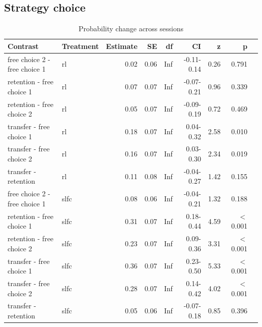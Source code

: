 \documentclass[pdflatex,sn-nature]{sn-jnl}%
\theoremstyle{thmstyleone}%
\theoremstyle{thmstyletwo}%
\theoremstyle{thmstylethree}%
\begin{document}
\begin{appendices}
\subsection{Strategy choice}








\begin{table}[ht]
\caption{Probability change across sessions}\label{strategychoice_theorybest_change}
\begin{tabular}{llrrrrrrr}
  \hline
 Contrast & Treatment & Estimate & SE & df & CI & z & p \\ 
  \hline
  free choice 2 - free choice 1 & rl & 0.02 & 0.06 & Inf & -0.11-0.14 & 0.26 &   0.791 \\ 
  retention - free choice 1 & rl & 0.07 & 0.07 & Inf & -0.07-0.21 & 0.96 &   0.339 \\ 
  retention - free choice 2 & rl & 0.05 & 0.07 & Inf & -0.09-0.19 & 0.72 &    0.469 \\ 
  transfer - free choice 1 & rl & 0.18 & 0.07 & Inf & 0.04-0.32 & 2.58 &    0.010 \\ 
  transfer - free choice 2 & rl & 0.16 & 0.07 & Inf & 0.03-0.30 & 2.34 &    0.019 \\ 
  transfer - retention & rl & 0.11 & 0.08 & Inf & -0.04-0.27 & 1.42 &    0.155 \\ 
  free choice 2 - free choice 1 & slfc & 0.08 & 0.06 & Inf & -0.04-0.21 & 1.32 &    0.188 \\ 
  retention - free choice 1 & slfc & 0.31 & 0.07 & Inf & 0.18-0.44 & 4.59 &  $<$  0.001 \\ 
  retention - free choice 2 & slfc & 0.23 & 0.07 & Inf & 0.09-0.36 & 3.31 &  $<$  0.001 \\ 
  transfer - free choice 1 & slfc & 0.36 & 0.07 & Inf & 0.23-0.50 & 5.33 &  $<$  0.001 \\ 
  transfer - free choice 2 & slfc & 0.28 & 0.07 & Inf & 0.14-0.42 & 4.02 &  $<$  0.001 \\ 
  transfer - retention & slfc & 0.05 & 0.06 & Inf & -0.07-0.18 & 0.85 &    0.396 \\ 
   \hline
\end{tabular}
\end{table}

\newpage


\end{appendices}
\end{document}
